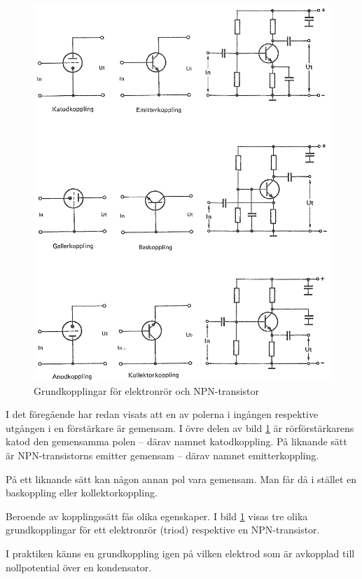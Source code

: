 \begin{figure}
\includegraphics[width=\textwidth]{images/cropped_pdfs/bild_2_3-42.pdf}
\caption{Grundkopplingar för elektronrör och NPN-transistor}
\label{fig:BildII3-42}
\end{figure}

I det föregående har redan visats att en av polerna i ingången respektive
utgången i en förstärkare är gemensam.
I övre delen av bild \ref{fig:BildII3-42} är rörförstärkarens katod den gemensamma
polen -- därav namnet katodkoppling.
På liknande sätt är NPN-transistorns emitter gemensam
-- därav namnet emitterkoppling.

På ett liknande sätt kan någon annan pol vara gemensam.
Man får då i stället en baskoppling eller kollektorkoppling.

Beroende av kopplingssätt fås olika egenskaper.
I bild \ref{fig:BildII3-42} visas tre olika grundkopplingar för ett elektronrör (triod)
respektive en NPN-transistor.

I praktiken känns en grundkoppling igen på vilken elektrod som är
avkopplad till nollpotential över en kondensator.

